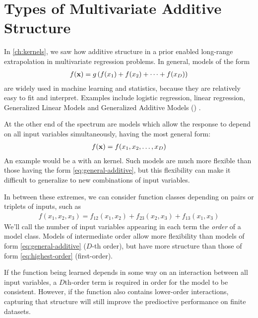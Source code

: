 \section{Types of Multivariate Additive Structure}
In \cref{ch:kernels}, we saw how additive structure in a \gp{} prior enabled long-range extrapolation in multivariate regression problems.
In general, models of the form
%
\begin{align}
f({\bf{x}}) = g \left( f(x_1) + f(x_2) + \dots + f(x_D) \right)
\label{eq:general-additive}
\end{align}
%
are widely used in machine learning and statistics, because they are relatively easy to fit and interpret.
Examples include logistic regression, linear regression, Generalized Linear Models \citep{nelder1972generalized} and Generalized Additive Models (\GAM{}) \citep{hastie1990generalized}.

At the other end of the spectrum are models which allow the response to depend on all input variables simultaneously, having the most general form:
%
\begin{align}
f({\bf{x}}) = f(x_1, x_2, \dots, x_D)
\label{eq:highest-order}
\end{align}
%
An example would be a \gp{} with an \seard{} kernel.
Such models are much more flexible than those having the form \eqref{eq:general-additive}, but this flexibility can make it difficult to generalize to new combinations of input variables.

In between these extremes, we can consider function classes depending on pairs or triplets of inputs, such as
%
\begin{align}
f(x_1, x_2, x_3) = f_{12}(x_1, x_2) + f_{23}(x_2, x_3) + f_{13}(x_1, x_3)
\label{eq:second-order-additive}
\end{align}
%
We'll call the number of input variables appearing in each term the \emph{order} of a model class.
Models of intermediate order allow more flexibility than models of form \eqref{eq:general-additive} ($D$-th order), but have more structure than those of form \eqref{eq:highest-order} (first-order).

If the function being learned depends in some way on an interaction between all input variables, a $D$th-order term is required in order for the model to be consistent.
However, if the function also contains lower-order interactions, capturing that structure will still improve the predioctive performance on finite datasets.

